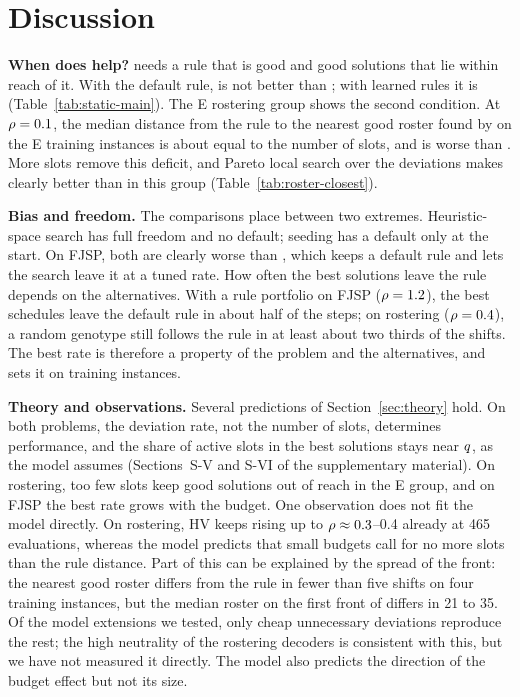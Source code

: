 \section{Discussion}
\label{sec:discussion}


\textbf{When does \RDD help?}
\RDD needs a rule that is good and good solutions that lie within reach of it.
With the default rule, \RDD is not better than ; with learned rules it is (Table~\ref{tab:static-main}).
The E rostering group shows the second condition.
At $\rho = 0.1$, the median distance from the rule to the nearest good roster found by  on the E training instances is about equal to the number of slots, and \RDD is worse than .
More slots remove this deficit, and Pareto local search over the deviations makes \RDD clearly better than  in this group (Table~\ref{tab:roster-closest}).

\textbf{Bias and freedom.}
The comparisons place \RDD between two extremes.
Heuristic-space search has full freedom and no default; seeding has a default only at the start.
On FJSP, both are clearly worse than \RDD, which keeps a default rule and lets the search leave it at a tuned rate.
How often the best solutions leave the rule depends on the alternatives.
With a rule portfolio on FJSP ($\rho = 1.2$), the best schedules leave the default rule in about half of the steps; on rostering ($\rho = 0.4$), a random genotype still follows the rule in at least about two thirds of the shifts.
The best rate is therefore a property of the problem and the alternatives, and \RDD sets it on training instances.

\textbf{Theory and observations.}
Several predictions of Section~\ref{sec:theory} hold.
On both problems, the deviation rate, not the number of slots, determines performance, and the share of active slots in the best solutions stays near $q$, as the model assumes (Sections~S-V and S-VI of the supplementary material).
On rostering, too few slots keep good solutions out of reach in the E group, and on FJSP the best rate grows with the budget.
One observation does not fit the model directly.
On rostering, HV keeps rising up to $\rho \approx 0.3$--0.4 already at 465 evaluations, whereas the model predicts that small budgets call for no more slots than the rule distance.
Part of this can be explained by the spread of the front: the nearest good roster differs from the rule in fewer than five shifts on four training instances,
but the median roster on the first front of  differs in 21 to 35.
Of the model extensions we tested, only cheap unnecessary deviations reproduce the rest; the high neutrality of the rostering decoders is consistent with this, but we have not measured it directly.
The model also predicts the direction of the budget effect but not its size.

